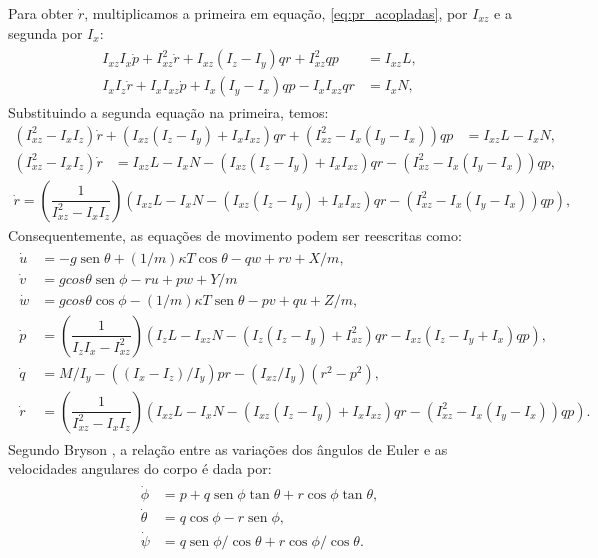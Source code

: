 \documentclass[12pt,a4paper]{article}
\DeclareMathOperator{\sen}{sen}
\begin{document}
Para obter \(\dot{r}\), multiplicamos a primeira em equação, \eqref{eq:pr_acopladas}, por \(I_{xz}\) e a segunda por \(I_x\):
\begin{align*}
    \begin{split}
       I_{xz}I_x \dot{p} + I_{xz}^2 \dot{r} + I_{xz}(I_z - I_y)qr + I_{xz}^2 qp &= I_{xz} L,\\
       I_xI_z \dot{r} + I_xI_{xz} \dot{p} + I_x(I_y - I_x) qp - I_xI_{xz} qr &= I_x N,
    \end{split}
\end{align*}
Substituindo a segunda equação na primeira, temos:
\begin{align*}
        (I_{xz}^2-I_xI_z)\dot{r} + (I_{xz}(I_z - I_y) +  I_xI_{xz}) qr + (I_{xz}^2  - I_x(I_y - I_x)) qp &= I_{xz} L - I_x N,
   \end{align*}
\begin{align*}
        (I_{xz}^2-I_xI_z)\dot{r} &= I_{xz} L - I_x N - (I_{xz}(I_z - I_y) +  I_xI_{xz}) qr - (I_{xz}^2  - I_x(I_y - I_x)) qp ,
   \end{align*}
\begin{align*}
    \boxed{\dot{r} = \left(\dfrac{1}{I_{xz}^2-I_xI_z}\right)\left(I_{xz} L - I_x N - (I_{xz}(I_z - I_y) +  I_xI_{xz}) qr - (I_{xz}^2  - I_x(I_y - I_x)) qp\right),}
   \end{align*}
Consequentemente, as equações de movimento podem ser reescritas como:
\begin{align}
    \begin{split}
        \dot{u} &= - g\sen\theta + (1/m)\kappa T \cos\theta - qw + rv + X/m  ,\\
        \dot{v} &= g cos\theta \sen\phi  - ru + pw + Y/m\\
        \dot{w} &= g cos\theta \cos\phi - (1/m)\kappa T \sen\theta  - pv + qu + Z/m ,\\
        \dot{p} & =\left(\dfrac{1}{I_zI_x - I_{xz}^2}\right)\left( I_zL - I_{xz}N - (I_z(I_z - I_y) + I_{xz}^2)qr - I_{xz}(I_z -I_y + I_x)qp\right),\\
        \dot{q} &= M/I_y  - ((I_x - I_z)/I_y) pr - (I_{xz}/I_y) (r^2 - p^2) ,\\
        \dot{r} &= \left(\dfrac{1}{I_{xz}^2-I_xI_z}\right)\left(I_{xz} L - I_x N - (I_{xz}(I_z - I_y) +  I_xI_{xz}) qr - (I_{xz}^2  - I_x(I_y - I_x)) qp\right).
    \end{split}
    \label{eq:boeing747-nonlinear-model_3}
\end{align}
Segundo Bryson \cite{brysonControlSpacecraftAircraft1994}, a relação entre as variações dos ângulos de Euler e as velocidades angulares do corpo é dada por:
\begin{align}
    \begin{split}
        \dot{\phi} &= p + q\sen\phi\tan\theta + r\cos\phi\tan\theta,\\
        \dot{\theta} &= q\cos\phi - r\sen\phi,\\
        \dot{\psi} &= q\sen\phi/\cos\theta + r\cos\phi/\cos\theta.
    \end{split}
    \label{eq:boeing747-euler-angles}
\end{align}
\end{document}
